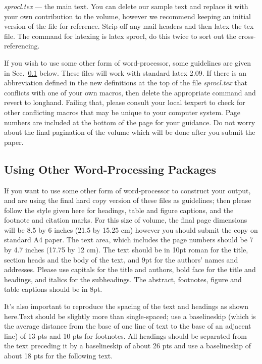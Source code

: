 \noindent 
{\em sprocl.tex} --- the main text. You can delete our  
sample text and replace it with your own contribution 
to the volume, however we recommend keeping an initial 
version of the file for reference. Strip off any mail 
headers and then latex the tex file.  The command for 
latexing is {\sf latex sprocl}, do this twice to sort 
out the cross-referencing.

If you wish to use some other form of word-processor, 
some guidelines are given in Sec.~\ref{subsec:wpp} 
below. These files will work with standard latex 
2.09. If there is an abbreviation defined in the new
definitions at the top of the file {\em sprocl.tex} that
conflicts with one of your own macros, then delete the
appropriate command and revert to longhand. Failing
that, please consult your local texpert to check for
other conflicting macros that may be unique to your
computer system. Page numbers are included at the
bottom of the page for your guidance. Do not worry about
the final pagination of the volume which will be done
after you submit the paper.

\subsection{Using Other Word-Processing Packages}\label{subsec:wpp}
If you want to use some other form of word-processor to
construct your output, and are using the final hard copy version
of these files as guidelines; then please follow the style given 
here for headings, table and figure captions, and the footnote 
and citation marks. For this size of volume, the final page 
dimensions will be 8.5 by 6 inches (21.5 by 15.25 cm) however
you should submit the copy on standard A4 paper. The text area,
which includes the page numbers should be 7 by 4.7 inches (17.75
by 12 cm). The text should be in 10pt roman for the title,
section heads and the body of the text, and 9pt for the authors'
names and addresses. Please use capitals for the title and
authors, bold face for the title and headings, and italics for
the subheadings. The abstract, footnotes, figure and table
captions should be in 8pt.

It's also important to reproduce the spacing of the text and headings
as shown here.Text should be slightly more than single-spaced; use a
baselineskip (which is the average distance from the base of one line
of text to the base of an adjacent line) of 13 pts and 10 pts for
footnotes. All headings should be separated from the text preceding
it by a baselineskip of about 26 pts and use a baselineskip of about
18 pts for the following text.

